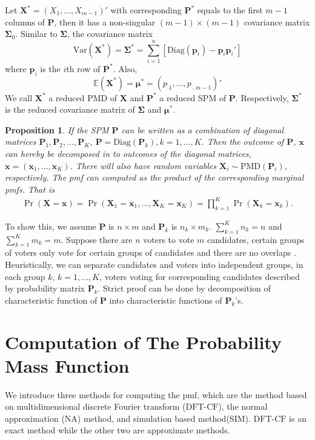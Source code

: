 \documentclass[12pt]{article}
\newcommand{\Sigmavec}{{\boldsymbol{\Sigma}}}
\newcommand{\EE}{\mathbb{E}}
\newcommand{\Pmat}{\mathbf{P}}
\newcommand{\pvec}{\boldsymbol{p}}
\newcommand{\Var}{{\textrm{Var}}}
\newcommand{\diag}{\textrm{Diag}}
\newcommand{\PMD}{\textrm{PMD}}
\newcommand{\Xvec}{\boldsymbol{X}}
\newcommand{\xvec}{\boldsymbol{x}}
\newcommand{\muvec}{\boldsymbol{\mu}}
\newcommand{\Sig}{\boldsymbol{\Sigma}}
\newcommand{\mvec}{\boldsymbol{\mu}}
\newcommand{\SIM}{{\textrm{SIM}}}
\newcommand{\NA}{{\textrm{NA}}}
\newcommand{\dft}{{\textrm{DFT-CF}}}
\newcommand{\qedw}{\hfill \ensuremath{\Box}}
\newtheorem{ppt}{Proposition}
\begin{document}
Let $\Xvec^{\ast}=(X_1,\dots,X_{m-1})'$ with corresponding $\Pmat^{\ast}$ equals to the first $m-1$ columns of $\Pmat$, then it has a non-singular $(m-1) \times (m-1)$ covariance matrix $\Sigmavec_{0}$. Similar to $\Sig$, the covariance matrix
 $$\Var(\Xvec^{\ast}) =\Sig^{\ast}=\sum_{i=1}^n[\diag(\pvec_i)-\pvec_i\pvec_i']$$
where $\pvec_i$ is the $i$th row of $\Pmat^{\ast}$. Also,
  $$\EE(\Xvec^{\ast}) =\muvec^{\ast} = \left( p_{\cdot1} ,\dots,p_{\cdot,m-1}\right)'$$
 We call $\Xvec^{\ast}$ a reduced $\PMD$ of $\Xvec$ and $\Pmat^{\ast}$ a reduced SPM of $\Pmat$. Respectively, $\Sig^{\ast}$ is the reduced covariance matrix of $\Sig$ and $\mvec^{\ast}$.
\begin{ppt}%
If the SPM $\Pmat$ can be written as a combination of diagonal matrices $\Pmat_1, \Pmat_2, \dots, \Pmat_{K}$, $\Pmat = \diag(\Pmat_{k}), k=1,\dots,K$. Then the outcome of $\Pmat$, $\xvec$ can hereby be decomposed in to outcomes of the diagonal matrices, $\xvec= (\xvec_{1},\dots,\xvec_{K})$.  There will also have random variables $\Xvec_{i} \sim \PMD(\Pmat_{i})$, respectively. The pmf can computed as the product of the corresponding marginal pmfs. That is
\begin{align*}
\Pr(\Xvec=\xvec)= \Pr(\Xvec_{1}=\xvec_{1}, \dots, \Xvec_{K}=\xvec_{K})= \prod_{k=1}^K \Pr(\Xvec_{k} = \xvec_{k}).
\end{align*}
\end{ppt}

To show this, we assume $\Pmat$ is $n \times m$ and $\Pmat_{k}$ is $n_k \times m_k$. $\sum_{k=1}^K n_k = n$ and $\sum_{k=1}^K m_k = m$. Suppose there are $n$ voters to vote $m$ candidates, certain groups of voters only vote for certain groups of candidates and there are no overlaps . Heuristically, we can separate candidates and voters into independent groups, in each group $k$, $k = 1,\dots,K$, voters voting for corresponding candidates described by probability matrix $\Pmat_{k}$. Strict proof can be done by decomposition of characteristic function of $\Pmat$ into characteristic functions of $\Pmat_{k}$'s.



\section{Computation of The Probability Mass Function}\label{sec:CA.driving.study}
We introduce three methods for computing the pmf, which are the method based on multidimensional discrete Fourier transform ($\dft$), the normal approximation ($\NA$) method, and simulation based method($\SIM$). $\dft$ is an exact method while the other two are approximate methods.
\end{document}
